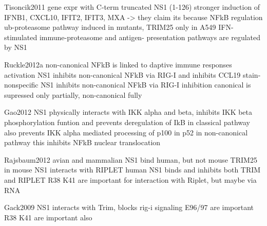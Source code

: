 		Tisoncik2011
		gene expr with C-term truncated NS1 (1-126)
		stronger induction of IFNB1, CXCL10, IFIT2, IFIT3, MXA -> they claim its because NFkB regulation
		ub-proteasome pathway induced in mutants, TRIM25 only in A549
		IFN-stimulated immune-proteasome and antigen- presentation pathways are regulated by NS1
		
		Ruckle2012a
		non-canonical NFkB is linked to daptive immune responses activation
		NS1 inhibits non-canonical NFkB via RIG-I and inhibits CCL19
		stain-nonspecific
		NS1 inhibits non-canonical NFkB via RIG-I inhibition
		canonical is supressed only partially, non-canonical fully
		
		Gao2012
		NS1 physically interacts with IKK alpha and beta, 
		inhibits IKK beta phosphorylation funtion and prevents deregulation of IkB in classical pathway
		also prevents IKK alpha mediated processing of p100 in p52 in non-canonical pathway
		this inhibits NFkB nuclear translocation
		
		Rajsbaum2012
		avian and mammalian NS1 bind human, but not mouse TRIM25
		in mouse NS1 interacts with RIPLET
		human NS1 binds and inhibits both TRIM and RIPLET
		R38 K41 are important for interaction with Riplet, but maybe via RNA
				
		Gack2009
		NS1 interacts with Trim, blocks rig-i signaling
		E96/97 are important
		R38 K41 are important also
	